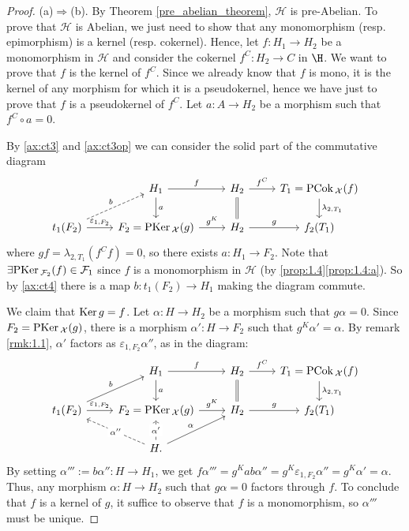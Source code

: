 \begin{proof}
(a)$\Rightarrow$(b). By Theorem \ref{pre_abelian_theorem}, $\mathcal{H}$ is pre-Abelian. To prove that $\mathcal{H}$ is Abelian, we just need to show that any monomorphism (resp. epimorphism) is a kernel (resp. cokernel).
Hence, let $f\colon H_1\to H_2$ be a monomorphism in $\mathcal{H}$ and consider the cokernel $f^C\colon H_2\to C$ in $\H$. We want to prove that $f$ is the kernel of $f^C$. Since we already know that $f$ is mono, it is the kernel of any morphism for which it is a pseudokernel, hence we have just to prove that $f$ is a pseudokernel of $f^C$. Let $a\colon A\to H_2$ be a morphism such that $f^C\circ a=0$. 






By \ref{ax:ct3} and \ref{ax:ct3op} we can consider the solid part of the commutative diagram
\begin{equation*}
\begin{tikzcd}
 & H_1\arrow{r}{f}\arrow{d}{a} & H_2\arrow{r}{f^C}\arrow[equal]{d} & T_1 = \PCok_\mathcal{X}(f)\arrow{d}{\lambda_{2,T_1}}\\
t_1(F_2)\arrow[dashed]{ur}{b}\arrow{r}{\varepsilon_{1,F_2}} & F_2=\PKer_\mathcal{X}(g)\arrow{r}{g^K} & H_2\arrow{r}{g} & f_2(T_1)
\end{tikzcd}
\end{equation*}
where $gf = \lambda_{2,T_1}(f^C f)=0$, so there exists $a:H_1\to F_2$. Note that $\exists \mathrm{\textup{PKer\,}}_{\mathcal{F}_2}(f)\in\mathcal{F}_1$ since $f$ is a monomorphism in $\mathcal{H}$ (by \cref{prop:1.4}\ref{prop:1.4:a}). So by \ref{ax:ct4}  there is a map $b:t_1(F_2)\to H_1$ making the diagram commute.

We claim that $\mathrm{\textup{Ker\,}} g = f$. Let $\alpha:H\to H_2$ be a morphism such that $g\alpha =0$. Since $F_2 = \mathrm{\textup{PKer\,}}_\mathcal{X}(g)$, there is a morphism $\alpha':H\to F_2$ such that $g^K\alpha'=\alpha$. By remark \ref{rmk:1.1}, $\alpha'$ factors as $\varepsilon_{1,F_2}\alpha''$, as in the diagram:
\begin{equation*}
\begin{tikzcd}
& H_1\arrow{r}{f}\arrow{d}{a} & H_2\arrow{r}{f^C}\arrow[equal]{d}& T_1 = \PCok_\mathcal{X}(f)\arrow{d}{\lambda_{2,T_1}}\\
t_1(F_2)\arrow{ur}{b}\arrow{r}{\varepsilon_{1,F_2}} & F_2=\PKer_\mathcal{X}(g)\arrow{r}{g^K} & H_2\arrow{r}{g} & f_2(T_1)\\
& H.\arrow{ur}{\alpha}\arrow[dashed]{u}[description]{\alpha'}\arrow[dashed]{ul}[description]{\alpha''} & &
\end{tikzcd}
\end{equation*}
By setting $\alpha''' := b\alpha'':H\to H_1$, we get $f\alpha''' = g^K ab\alpha'' = g^K\varepsilon_{1,F_2}\alpha''=g^K\alpha' = \alpha$. Thus, any morphism $\alpha:H \to H_2$ such that $g\alpha =0$ factors through $f$. To conclude that $f$ is a kernel of $g$, it suffice to observe that $f$ is a monomorphism, so $\alpha'''$ must be unique.


\end{proof}
